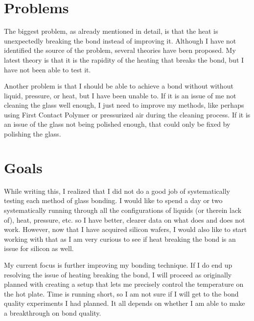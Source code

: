 \documentclass[colorlinks=true,pdfstartview=FitV,linkcolor=blue,
            citecolor=red,urlcolor=magenta]{ligodoc}
\begin{document}
\section{Problems}

The biggest problem, as already mentioned in detail, is that the heat is unexpectedly breaking the bond instead of improving it. Although I have not identified the source of the problem, several theories have been proposed. My latest theory is that it is the rapidity of the heating that breaks the bond, but I have not been able to test it.

Another problem is that I should be able to achieve a bond without without liquid, pressure, or heat, but I have been unable to. If it is an issue of me not cleaning the glass well enough, I just need to improve my methods, like perhaps using First Contact Polymer or pressurized air during the cleaning process. If it is an issue of the glass not being polished enough, that could only be fixed by polishing the glass.

\section{Goals}

While writing this, I realized that I did not do a good job of systematically testing each method of glass bonding. I would like to spend a day or two systematically running through all the configurations of liquids (or therein lack of), heat, pressure, etc. so I have better, clearer data on what does and does not work. However, now that I have acquired silicon wafers, I would also like to start working with that as I am very curious to see if heat breaking the bond is an issue for silicon as well.

My current focus is further improving my bonding technique. If I do end up resolving the issue of heating breaking the bond, I will proceed as originally planned with creating a setup that lets me precisely control the temperature on the hot plate. Time is running short, so I am not sure if I will get to the bond quality experiments I had planned. It all depends on whether I am able to make a breakthrough on bond quality.
\end{document}
